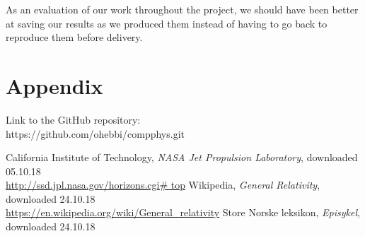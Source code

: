 \documentclass{article}
\begin{document}
As an evaluation of our work throughout the project, we should have been better at saving our results as we produced them instead of having to go back to reproduce them before delivery.


\section{Appendix}
Link to the GitHub repository:\\

https://github.com/ohebbi/compphys.git

\begin{thebibliography}{}
California Institute of Technology, \textit{NASA Jet Propulsion Laboratory}, downloaded 05.10.18\\
\url{http://ssd.jpl.nasa.gov/horizons.cgi# top}
Wikipedia, \textit{General Relativity}, downloaded 24.10.18\\
\url{https://en.wikipedia.org/wiki/General_relativity}
Store Norske leksikon, \textit{Episykel}, downloaded 24.10.18\\
\end{thebibliography}
\end{document}
